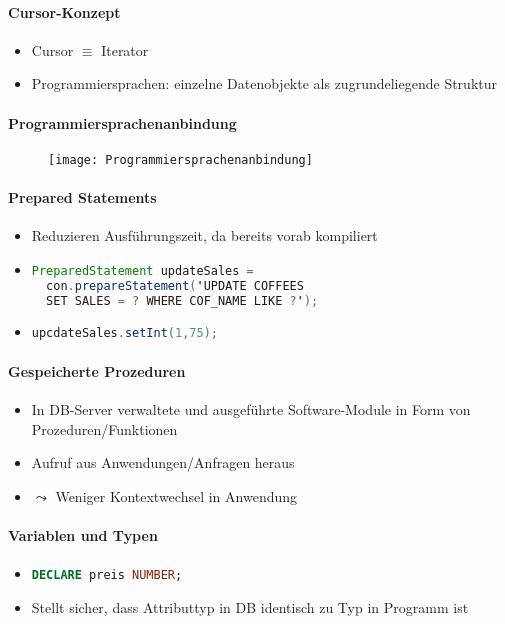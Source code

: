 \paragraph{Cursor-Konzept}
\begin{itemize}
	\item Cursor \( \equiv \) Iterator
	\item Programmiersprachen: einzelne Datenobjekte als zugrundeliegende Struktur
\end{itemize}



\paragraph{Programmiersprachenanbindung}
\begin{figure}[H]\centering\label{Programmiersprachenanbindung}\texttt{[image: Programmiersprachenanbindung]}\end{figure}

\paragraph{Prepared Statements}
\begin{itemize}
	\item Reduzieren Ausführungszeit, da bereits vorab kompiliert
	\item
		\begin{lstlisting}[language=java,showstringspaces=false]
PreparedStatement updateSales = 
  con.prepareStatement('UPDATE COFFEES 
  SET SALES = ? WHERE COF_NAME LIKE ?');
		\end{lstlisting}
	\item \lstinline[language=java]{upcdateSales.setInt(1,75);}
\end{itemize}

\paragraph{Gespeicherte Prozeduren}
\begin{itemize}
	\item In DB-Server verwaltete und ausgeführte Software-Module in Form von Prozeduren/Funktionen
	\item Aufruf aus Anwendungen/Anfragen heraus
	\item \( \leadsto \) Weniger Kontextwechsel in Anwendung
\end{itemize}

\paragraph{Variablen und Typen}
\begin{itemize}
	\item \lstinline[language=sql]{DECLARE preis NUMBER;}
	\item Stellt sicher, dass Attributtyp in DB identisch zu Typ in Programm ist
\end{itemize}

